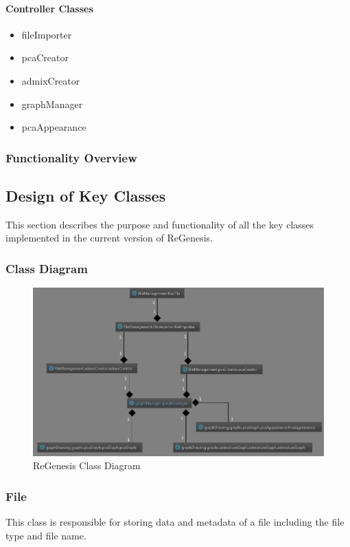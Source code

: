 \documentclass[11pt]{article}
\begin{document}
\paragraph{Controller Classes}
\begin{itemize}
	\item fileImporter
	\item pcaCreator
	\item admixCreator
	\item graphManager
	\item pcaAppearance
\end{itemize}

\subsubsection{Functionality Overview}

\subsection{Design of Key Classes}
This section describes the purpose and functionality of all the key classes implemented in the current version of ReGenesis.
\subsubsection{Class Diagram}

\begin{figure}[h]
\centering
\includegraphics[scale = 0.65]{regenesis_class_precursor.png}
\caption{ReGenesis Class Diagram}
\label{rgf class diagram}
\end{figure}

\subsubsection{File}
This class is responsible for storing data and metadata of a file including the file type and file name.
\end{document}

